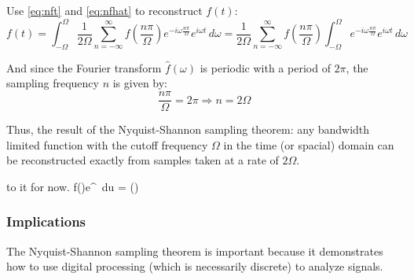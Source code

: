 \documentclass[12pt]{article}
\newcommand{\inftyint}{\int_{-\infty}^{\infty}}
\begin{document}
Use \eqref{eq:nft} and \eqref{eq:nfhat} to reconstruct \( f(t)  \):
\begin{equation}
\label{eq:ndtft}
f(t) = \int_{-\Omega}^{\Omega} \frac{1}{2\Omega} \sum_{n = -\infty}^{\infty} 
f(\frac{n\pi}{\Omega})e^{-i \omega \frac{n \pi}{\Omega} } e^{i\omega t} 
\,d\omega = \frac{1}{2\Omega} \sum_{n = -\infty}^{\infty} 
f(\frac{n\pi}{\Omega}) \int_{-\Omega}^{\Omega} e^{-i \omega \frac{n 
\pi}{\Omega} } e^{i\omega t} \, d\omega
\end{equation}

And since the Fourier transform \( \hat{f}(\omega) \) is periodic with a period 
of \( 2\pi\), the sampling frequency \( n\) is given by:
\[ \frac{n\pi}{\Omega} = 2\pi \Rightarrow n = 2\Omega\]

Thus, the result of the Nyquist-Shannon sampling theorem: any bandwidth limited 
function with the cutoff frequency \( \Omega \) in the time (or spacial) domain 
can be reconstructed exactly from samples taken at a rate of \( 2\Omega \).

to it for now.
f()e^{} \]
%
%
\,du =  \;  () \]


\subsubsection{Implications}

The Nyquist-Shannon sampling theorem is important because it demonstrates how 
to use digital processing (which is necessarily discrete) to analyze signals. 
\end{document}
